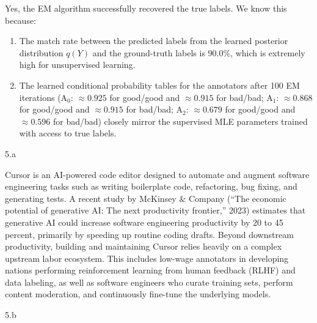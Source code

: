 \begin{answer}
  Yes, the EM algorithm successfully recovered the true labels. We know this because:
  \begin{enumerate}
      \item The match rate between the predicted labels from the learned posterior distribution $q(Y)$ and the ground-truth labels is $90.0\%$, which is extremely high for unsupervised learning.
      \item The learned conditional probability tables for the annotators after 100 EM iterations ($\text{A}_0$: $\approx 0.925$ for good/good and $\approx 0.915$ for bad/bad; $\text{A}_1$: $\approx 0.868$ for good/good and $\approx 0.915$ for bad/bad; $\text{A}_2$: $\approx 0.679$ for good/good and $\approx 0.596$ for bad/bad) closely mirror the supervised MLE parameters trained with access to true labels.
  \end{enumerate}
\end{answer}

\clearpage


\LARGE
5.a
\normalsize

\begin{answer}
  Cursor is an AI-powered code editor designed to automate and augment software engineering tasks such as writing boilerplate code, refactoring, bug fixing, and generating tests. A recent study by McKinsey \& Company (``The economic potential of generative AI: The next productivity frontier,'' 2023) estimates that generative AI could increase software engineering productivity by 20 to 45 percent, primarily by speeding up routine coding drafts. Beyond downstream productivity, building and maintaining Cursor relies heavily on a complex upstream labor ecosystem. This includes low-wage annotators in developing nations performing reinforcement learning from human feedback (RLHF) and data labeling, as well as software engineers who curate training sets, perform content moderation, and continuously fine-tune the underlying models.
\end{answer}

\LARGE
5.b
\normalsize

